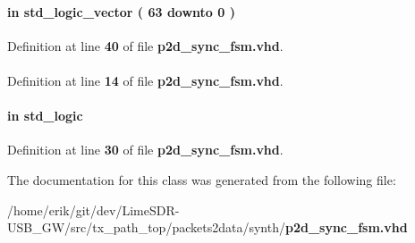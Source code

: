 \paragraph[{smpl\+\_\+nr}]{ {\bfseries \textcolor{keywordflow}{in}\textcolor{vhdlchar}{ }} {\bfseries \textcolor{comment}{std\+\_\+logic\+\_\+vector}\textcolor{vhdlchar}{ }\textcolor{vhdlchar}{(}\textcolor{vhdlchar}{ }\textcolor{vhdlchar}{ } \textcolor{vhdldigit}{63} \textcolor{vhdlchar}{ }\textcolor{keywordflow}{downto}\textcolor{vhdlchar}{ }\textcolor{vhdlchar}{ } \textcolor{vhdldigit}{0} \textcolor{vhdlchar}{ }\textcolor{vhdlchar}{)}\textcolor{vhdlchar}{ }} \hspace{0.3cm}{\ttfamily [Port]}}\label{classp2d__sync__fsm_a6ea92059bac477bfe9a5679da537fec5}


Definition at line {\bf 40} of file {\bf p2d\+\_\+sync\+\_\+fsm.\+vhd}.

\paragraph[{std\+\_\+logic\+\_\+1164}]{\hspace{0.3cm}{\ttfamily [Package]}}\label{classp2d__sync__fsm_acd03516902501cd1c7296a98e22c6fcb}


Definition at line {\bf 14} of file {\bf p2d\+\_\+sync\+\_\+fsm.\+vhd}.

\paragraph[{trxiqpulse}]{ {\bfseries \textcolor{keywordflow}{in}\textcolor{vhdlchar}{ }} {\bfseries \textcolor{comment}{std\+\_\+logic}\textcolor{vhdlchar}{ }} \hspace{0.3cm}{\ttfamily [Port]}}\label{classp2d__sync__fsm_a808d6d382f3c6a02784a160f67d0f891}


Definition at line {\bf 30} of file {\bf p2d\+\_\+sync\+\_\+fsm.\+vhd}.



The documentation for this class was generated from the following file\+:\begin{DoxyCompactItemize}
\item 
/home/erik/git/dev/\+Lime\+S\+D\+R-\/\+U\+S\+B\+\_\+\+G\+W/src/tx\+\_\+path\+\_\+top/packets2data/synth/{\bf p2d\+\_\+sync\+\_\+fsm.\+vhd}\end{DoxyCompactItemize}
